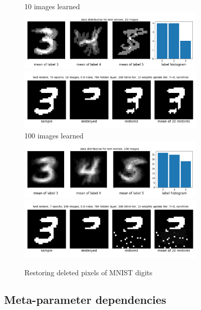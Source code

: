 \documentclass[12pt,twoside]{article}
\theoremstyle{plain}
\theoremstyle{definition}
\theoremstyle{remark}
\begin{document}
\begin{figure}[h!]
	\begin{center}
	10 images learned
	\includegraphics[trim={0.2cm 0.5cm 0cm 1.7cm},clip,width=0.79\textwidth]{src/data_distribution_10_images}
	\includegraphics[trim={0cm 1.0cm 0cm 0cm},clip,width=0.8\textwidth]{src/test_restore_10_images}\\
	100 images learned
	\includegraphics[trim={0.2cm 0.5cm 0cm 1.7cm},clip,width=0.79\textwidth]{src/data_distribution_100_images}
	\includegraphics[trim={0cm 1.0cm 0cm 0cm},clip,width=0.8\textwidth]{src/test_restore_100_images}
	\end{center}
	\caption{Restoring deleted pixels of MNIST digits}\label{fig:test_restore}
\end{figure}


\subsection{Meta-parameter dependencies}
\end{document}
